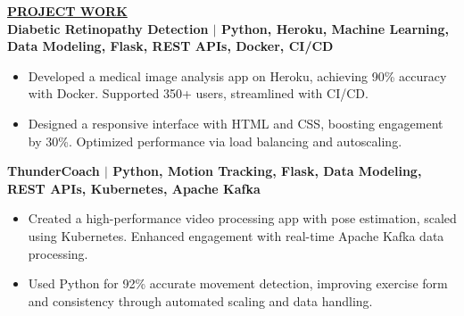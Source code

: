 \documentclass{article}
\begin{document}
\vspace{2mm} 
\noindent \textbf{\underline{PROJECT WORK}} \\
\noindent \textbf{Diabetic Retinopathy Detection $\mid$ {\small Python, Heroku, Machine Learning, Data Modeling, Flask, REST APIs, Docker, CI/CD}}
\begin{itemize}[noitemsep,nolistsep,leftmargin=*]
\item {\small Developed a medical image analysis app on Heroku, achieving 90\% accuracy with Docker. Supported 350+ users, streamlined with CI/CD.}
\item {\small Designed a responsive interface with HTML and CSS, boosting engagement by 30\%. Optimized performance via load balancing and autoscaling.}\\
\end{itemize}

\noindent \textbf{ThunderCoach $\mid$ {\small Python, Motion Tracking, Flask, Data Modeling, REST APIs, Kubernetes, Apache Kafka}}
\begin{itemize}[noitemsep,nolistsep,leftmargin=*]
\item {\small Created a high-performance video processing app with pose estimation, scaled using Kubernetes. Enhanced engagement with real-time Apache Kafka data processing.}
\item {\small Used Python for 92\% accurate movement detection, improving exercise form and consistency through automated scaling and data handling.}\\
\end{itemize}




\end{document}

